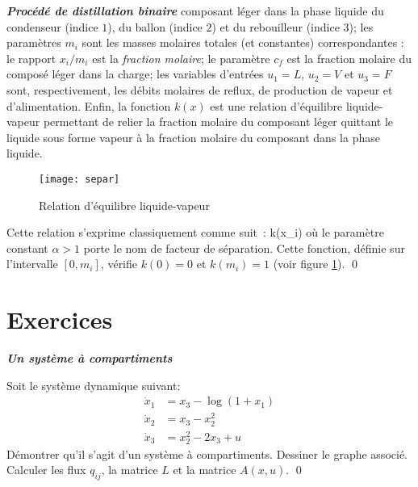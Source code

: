 \begin{exemple}{\bf \em Procédé de distillation binaire}
composant léger dans la phase liquide du condenseur (indice $1$), du ballon (indice $2$) et du rebouilleur (indice  $3$); les paramètres $m_i$ sont les 
masses molaires totales (et constantes) correspondantes : le rapport $x_i/m_i$ est la {\it fraction molaire}; le paramètre $c_f$
est la fraction molaire du composé léger dans la charge; les variables d'entrées $u_1 =
L$, $u_2 = V$ et
$u_3 = F$ sont, respectivement, les débits molaires de reflux, de production de vapeur et
d'alimentation. Enfin, la fonction $k(x)$ est une relation d'équilibre
liquide-vapeur permettant de relier la fraction molaire du composant léger quittant le liquide
sous forme vapeur à la fraction molaire du composant dans la phase liquide. 
\begin{figure}[ht]
\begin{center}
\texttt{[image: separ]}
\caption{Relation d'équilibre liquide-vapeur}
\label{Fig:separ}
\end{center} 
\end{figure}

\noindent Cette
relation s'exprime classiquement comme suit~:
\eqnn
k(x_i) \triangleq {}
\eeqnn
où le paramètre constant $\alpha > 1$ porte le nom de facteur de séparation.
Cette fonction, définie sur l'intervalle $[0,m_i]$, vérifie $k(0) = 0$ et
$k(m_i) = 1$ (voir figure \ref{Fig:separ}). \qed  
\end{exemple}

\section{Exercices}

\begin{exercice}{\bf \em Un système à compartiments}

Soit le système dynamique suivant:
\begin{align*}
\dot x_{1} &= x_{3} - \log (1+x_{1}) \\
\dot x_{2} &= x_{3} - x_{2}^2 \\
\dot x_{3} &= x_{2}^2 - 2x_{3} + u
\end{align*}
Démontrer qu'il s'agit d'un système à compartiments. Dessiner le graphe associé. Calculer les flux $q_{ij}$, la matrice $L$ et la matrice $A(x,u)$. \qed
\end{exercice}
\vv


